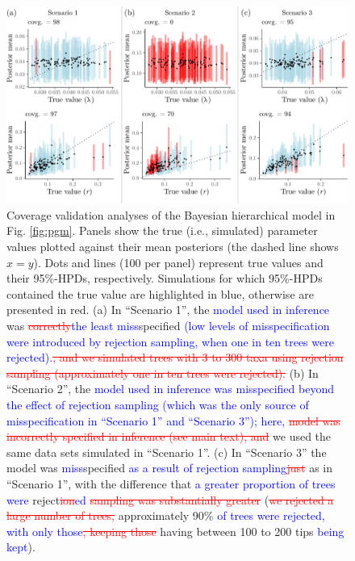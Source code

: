 \documentclass[oneside]{article}
\begin{document}
\begin{figure}
  \includegraphics[width=\textwidth]{../figures/graphical_model_coverage.pdf}
  \caption{
    Coverage validation analyses of the Bayesian hierarchical model in Fig. \ref{fig:pgm}.
    Panels show the true (i.e., simulated) parameter values plotted against their mean posteriors (the dashed line shows $x = y$).
    Dots and lines (100 per panel) represent true values and their 95\%-HPDs, respectively.
    Simulations for which 95\%-HPDs contained the true value are highlighted in blue, otherwise are presented in red.
    (a) In ``Scenario 1'', the \textcolor{blue}{model used in inference} was \textcolor{red}{\st{correctly}}\textcolor{blue}{the least miss}specified \textcolor{blue}{(low levels of misspecification were introduced by rejection sampling, when one in ten trees were rejected).}\textcolor{red}{\st{, and we simulated trees with 3 to 300 taxa using rejection sampling (approximately one in ten trees were rejected).}}
    (b) In ``Scenario 2'', the \textcolor{blue}{model used in inference was misspecified beyond the effect of rejection sampling (which was the only source of misspecification in ``Scenario 1'' and ``Scenario 3''); here, }\textcolor{red}{\st{model was incorrectly specified in inference (see main text), and}} we used the same data sets simulated in ``Scenario 1''.
    (c) In ``Scenario 3'' the model was \textcolor{blue}{miss}specified \textcolor{blue}{as a result of rejection sampling}\textcolor{red}{\st{just}} as in ``Scenario 1'', with the difference that \textcolor{blue}{a greater proportion of trees were} reject\textcolor{red}{\st{ion}}\textcolor{blue}{ed}\textcolor{red}{\st{ sampling was substantially greater}} (\textcolor{red}{\st{we rejected a large number of trees, }}approximately 90\% \textcolor{blue}{of trees were rejected, with only those}\textcolor{red}{\st{, keeping those }}having between 100 to 200 tips \textcolor{blue}{being kept}).
  }
  \label{fig:yulecalval}
\end{figure} 
\end{document}
